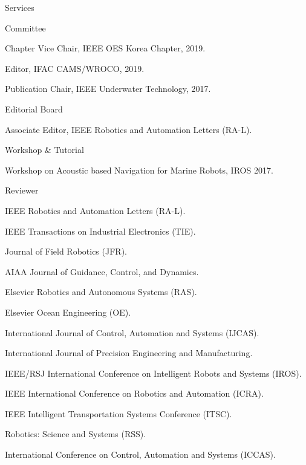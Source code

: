 \begin{rSection}{Services}

\begin{rSubsection}{Committee}{}{}{}

  \item Chapter Vice Chair, IEEE OES Korea Chapter, 2019.
  \item Editor, IFAC CAMS/WROCO, 2019.


  \item Publication Chair, IEEE Underwater Technology, 2017.
\end{rSubsection}

\begin{rSubsection}{Editorial Board}{}{}{}
  \item Associate Editor, IEEE Robotics and Automation Letters (RA-L).
\end{rSubsection}

\begin{rSubsection}{Workshop \& Tutorial}{}{}{}
  \item Workshop on Acoustic based Navigation for Marine Robots, IROS 2017.
\end{rSubsection}

\begin{rSubsection}{Reviewer}{}{}{}
  \item IEEE Robotics and Automation Letters (RA-L).
  \item IEEE Transactions on Industrial Electronics (TIE).
  \item Journal of Field Robotics (JFR).
  \item AIAA Journal of Guidance, Control, and Dynamics.
  \item Elsevier Robotics and Autonomous Systems (RAS).
  \item Elsevier Ocean Engineering (OE).
  \item International Journal of Control, Automation and Systems (IJCAS).
  \item International Journal of Precision Engineering and Manufacturing.
  \item IEEE/RSJ International Conference on Intelligent Robots and Systems (IROS).
  \item IEEE International Conference on Robotics and Automation (ICRA).
  \item IEEE Intelligent Transportation Systems Conference (ITSC).
  \item Robotics: Science and Systems (RSS).
  \item International Conference on Control, Automation and Systems (ICCAS).
\end{rSubsection}


\end{rSection}

